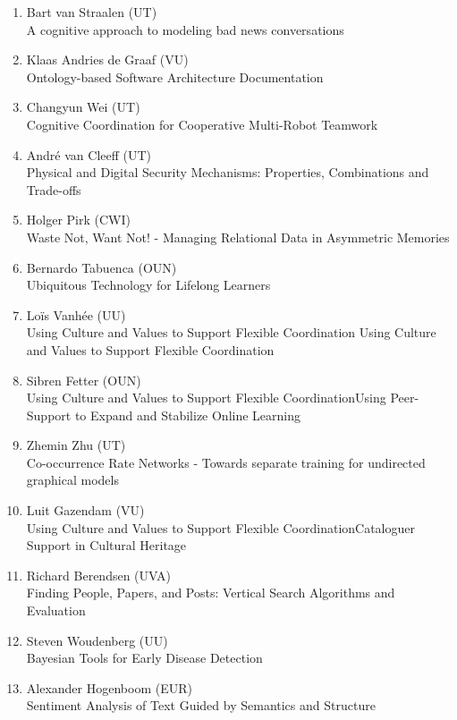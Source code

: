 \begin{multicols}{2}
\begin{scriptsize}
\begin{enumerate}[label=\textbf{2015-\arabic*},leftmargin=0cm,itemindent=1.15cm,labelwidth=\itemindent,labelsep=0cm,align=left,noitemsep]
\item Bart van Straalen (UT)  \\
	A cognitive approach to modeling bad news conversations

\item Klaas Andries de Graaf (VU)  \\
	Ontology-based Software Architecture Documentation

\item Changyun Wei (UT)  \\
	Cognitive Coordination for Cooperative Multi-Robot Teamwork	
	
\item André van Cleeff (UT)   \\
	Physical and Digital Security Mechanisms: Properties, Combinations and Trade-offs

\item Holger Pirk (CWI)  \\
	Waste Not, Want Not! - Managing Relational Data in Asymmetric Memories
\item Bernardo Tabuenca (OUN)   \\
	Ubiquitous Technology for Lifelong Learners
\item Loïs Vanhée (UU)   \\
	Using Culture and Values to Support Flexible Coordination Using Culture and Values to Support Flexible Coordination
	

\item Sibren Fetter (OUN)   \\
	Using Culture and Values to Support Flexible CoordinationUsing Peer-Support to Expand and Stabilize Online Learning
	
\item Zhemin Zhu (UT)  \\
	Co-occurrence Rate Networks - Towards separate training for undirected graphical models
	
\item Luit Gazendam (VU)   \\
	Using Culture and Values to Support Flexible CoordinationCataloguer Support in Cultural Heritage
	
\item Richard Berendsen (UVA)   \\
	Finding People, Papers, and Posts: Vertical Search Algorithms and Evaluation
	
\item Steven Woudenberg (UU)   \\
	Bayesian Tools for Early Disease Detection
\item Alexander Hogenboom (EUR)   \\
	Sentiment Analysis of Text Guided by Semantics and Structure


\end{enumerate}
\end{scriptsize}
\end{multicols}
